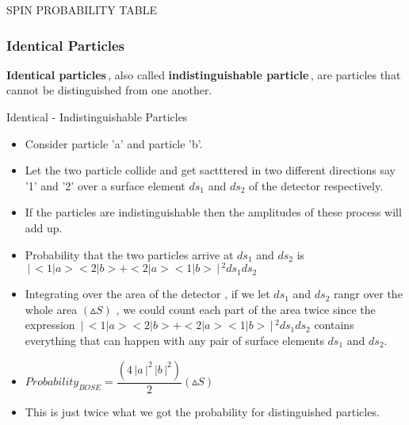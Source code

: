 \documentclass[aspectratio=169]{beamer}
\begin{document}
\begin{frame}

	SPIN PROBABILITY TABLE
\end{frame}

\begin{frame}
	\frametitle{Identical Particles}
	
		{\large \textbf{Identical particles}\,, also called \textbf{indistinguishable particle}\,, are particles that cannot be distinguished from one another.}
		
\end{frame}

\begin{frame}{Identical - Indistinguishable Particles}
	\begin{itemize}
		\item Consider particle 'a' and particle 'b'. \newline
		\item Let the two particle collide and get sactttered in two different directions say '1' and '2' over a surface element $ds_{1}$ and $ds_{2}$ of the detector respectively. \newline
		\item If the particles are indistinguishable then the amplitudes of these process will add up. \newline
		\item Probability that the two particles arrive at $ds_{1}$ and $ds_{2}$ is \newline
		$\,\Bigr\rvert\,<1|a><2|b> + <2|a><1|b>\,\Bigr\rvert\,^{2} ds_{1} ds_{2}$
		
	\end{itemize}
\end{frame}

\begin{frame}
	\begin{itemize}
		\item Integrating over the area of the detector ,  if we let $ds_{1}$ and $ds_{2}$ rangr over the whole area $(\vartriangle S)$ , we could count each part of the area twice since the expression $\,\Bigr\rvert\,<1|a><2|b> + <2|a><1|b>\,\Bigr\rvert\,^{2} ds_{1} ds_{2}$ contains everything that can happen with any pair of surface elements $ds_{1}$ and $ds_{2}$. \newline
		\item $ Probability_{BOSE} = \dfrac{ \left(4\,\Bigr\rvert a \,\Bigr\rvert^{2} \,\Bigr\rvert b \,\Bigr\rvert^{2}\right)}{2} \left(\vartriangle S\right)$ \newline
		\item This is just twice what we got the probability for distinguished particles. 

	\end{itemize}
\end{frame}
\end{document}
